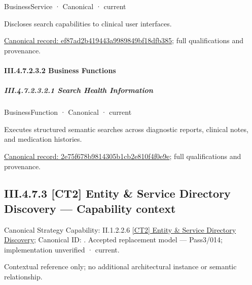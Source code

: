 \label{element:ef87ad2b419443a9989849bf18dfb385}
{\small BusinessService · Canonical · current}\par

Discloses search capabilities to clinical user interfaces.


{\footnotesize \href{../../../../../../../../continuum/business/business-service/ef87ad2b419443a9989849bf18dfb385.md}{Canonical record: ef87ad2b419443a9989849bf18dfb385}; full qualifications and provenance.}\par
\paragraph*{III.4.7.2.3.2 Business Functions}
\label{navigation:III.4.7.2.3.2}

\subparagraph*{III.4.7.2.3.2.1 Search Health Information}
\label{navigation:III.4.7.2.3.2.1}

\label{element:2e75f678b9814305b1cb2e810f4f0e9e}
{\small BusinessFunction · Canonical · current}\par

Executes structured semantic searches across diagnostic reports, clinical notes, and medication histories.


{\footnotesize \href{../../../../../../../../continuum/business/business-function/2e75f678b9814305b1cb2e810f4f0e9e.md}{Canonical record: 2e75f678b9814305b1cb2e810f4f0e9e}; full qualifications and provenance.}\par
\subsection*{III.4.7.3 [CT2] Entity \& Service Directory Discovery — Capability context}
\label{navigation:III.4.7.3}

{\small Canonical Strategy Capability: II.1.2.2.6 \hyperref[element:83e30c3e91be432da6d92f30e5d7005d]{[CT2] Entity \& Service Directory Discovery}; Canonical ID: \texttt{}. Accepted replacement model — Pass3/014; implementation unverified · current.}\par
Contextual reference only; no additional architectural instance or semantic relationship.\par
